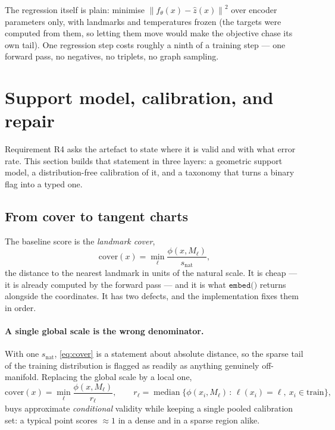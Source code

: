 \documentclass[12pt]{iopart}
\theoremstyle{definition}
\theoremstyle{plain}
\theoremstyle{remark}
\newcommand{\norm}[1]{\left\lVert#1\right\rVert}
\DeclareMathOperator{\med}{median}
\newcommand{\code}[1]{\texttt{#1}}
\begin{document}
The regression itself is plain: minimise $\norm{f_\theta(x)-\hat z(x)}^2$ over
encoder parameters only, with landmarks and temperatures frozen (the targets
were computed from them, so letting them move would make the objective chase
its own tail). One regression step costs roughly a ninth of a training step ---
one forward pass, no negatives, no triplets, no graph sampling.

\section{Support model, calibration, and repair}
\label{sec:conformal}

Requirement R4 asks the artefact to state where it is valid and with what error
rate. This section builds that statement in three layers: a geometric support
model, a distribution-free calibration of it, and a taxonomy that turns a
binary flag into a typed one.

\subsection{From cover to tangent charts}
\label{sec:cover}

The baseline score is the \emph{landmark cover},
\begin{equation}
\label{eq:cover}
\mathrm{cover}(x) = \min_\ell \frac{\phi(x,M_\ell)}{s_{\mathrm{nat}}},
\end{equation}
the distance to the nearest landmark in units of the natural scale. It is
cheap --- it is already computed by the forward pass --- and it is what
$\code{embed()}$ returns alongside the coordinates. It has two defects, and the
implementation fixes them in order.

\paragraph{A single global scale is the wrong denominator.}
With one $s_{\mathrm{nat}}$, \eqref{eq:cover} is a statement about absolute
distance, so the sparse tail of the training distribution is flagged as readily
as anything genuinely off-manifold. Replacing the global scale by a local one,
\begin{equation}
\label{eq:covlocal}
\mathrm{cover}(x)=\min_\ell\frac{\phi(x,M_\ell)}{r_\ell},
\qquad
r_\ell=\med\bigl\{\phi(x_i,M_\ell)\,:\,\ell(x_i)=\ell,\ x_i\in\text{train}\bigr\},
\end{equation}
buys approximate \emph{conditional} validity while keeping a single pooled
calibration set: a typical point scores $\approx1$ in a dense and in a sparse
region alike.
\end{document}
